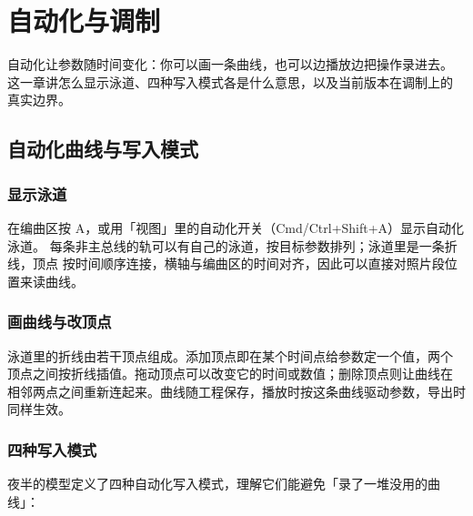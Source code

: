 
\chapter{自动化与调制}
\label{ch:automation-modulation}






自动化让参数随时间变化：你可以画一条曲线，也可以边播放边把操作录进去。
这一章讲怎么显示泳道、四种写入模式各是什么意思，以及当前版本在调制上的
真实边界。

\section{自动化曲线与写入模式}

\subsection{显示泳道}

在编曲区按 A，或用「视图」里的自动化开关（Cmd/Ctrl+Shift+A）显示自动化泳道。
每条非主总线的轨可以有自己的泳道，按目标参数排列；泳道里是一条折线，顶点
按时间顺序连接，横轴与编曲区的时间对齐，因此可以直接对照片段位置来读曲线。


\subsection{画曲线与改顶点}

泳道里的折线由若干顶点组成。添加顶点即在某个时间点给参数定一个值，两个
顶点之间按折线插值。拖动顶点可以改变它的时间或数值；删除顶点则让曲线在
相邻两点之间重新连起来。曲线随工程保存，播放时按这条曲线驱动参数，导出时
同样生效。

\subsection{四种写入模式}

夜半的模型定义了四种自动化写入模式，理解它们能避免「录了一堆没用的曲线」：

